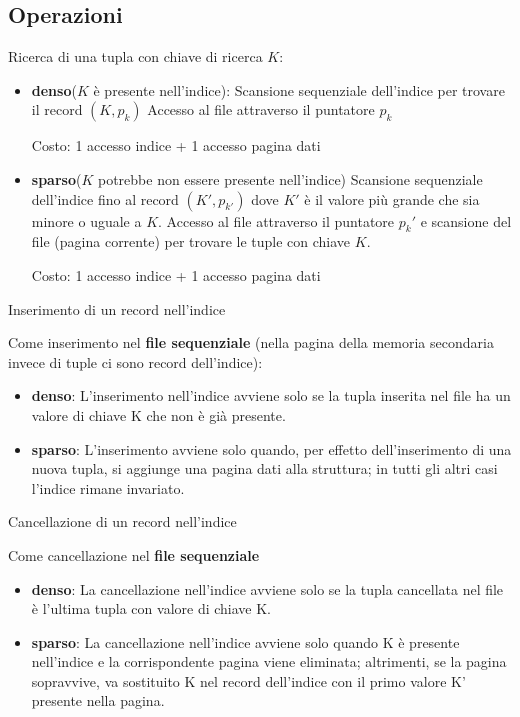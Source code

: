 \documentclass[a4paper, 10pt]{article}
\theoremstyle{definition}
\begin{document}
		\subsection*{Operazioni}
		
		Ricerca di una tupla con chiave di ricerca $K$:
		\begin{itemize}
			\item \textbf{denso}($K$ è presente nell'indice):
				\subitem{-} Scansione sequenziale dell'indice per trovare il record $(K, p_k )$
				\subitem{-} Accesso al file attraverso il puntatore $p_k$
				
			Costo: 1 accesso indice + 1 accesso pagina dati
			\item \textbf{sparso}($K$ potrebbe non essere presente nell'indice)
				\subitem{-} Scansione sequenziale dell'indice fino al record $(K', p_{k'} )$ dove $K'$ è il
				valore più grande che sia minore o uguale a $K$.
				\subitem{-} Accesso al file attraverso il puntatore $p_k'$ e scansione del file
				(pagina corrente) per trovare le tuple con chiave $K$.
				
			Costo: 1 accesso indice + 1 accesso pagina dati
		\end{itemize}
		Inserimento di un record nell'indice
		
		Come inserimento nel \textbf{file sequenziale} (nella pagina della
		memoria secondaria invece di tuple ci sono record dell'indice):
		\begin{itemize}
			\item \textbf{denso}: L'inserimento nell'indice avviene solo se la tupla inserita nel file ha
			un valore di chiave K che non è già presente.
			\item \textbf{sparso}:  L'inserimento avviene solo quando, per effetto dell'inserimento di
			una nuova tupla, si aggiunge una pagina dati alla struttura; in tutti
			gli altri casi l'indice rimane invariato.
		\end{itemize}
		Cancellazione di un record nell'indice
		
		Come cancellazione nel \textbf{file sequenziale} 
		\begin{itemize}
			\item \textbf{denso}: La cancellazione nell'indice avviene solo se la tupla cancellata nel
			file è l'ultima tupla con valore di chiave K.
			\item \textbf{sparso}: La cancellazione nell'indice avviene solo quando K è presente
			nell'indice e la corrispondente pagina viene eliminata; altrimenti,
			se la pagina sopravvive, va sostituito K nel record dell'indice con il
			primo valore K' presente nella pagina.  
		\end{itemize}
		
\end{document}
